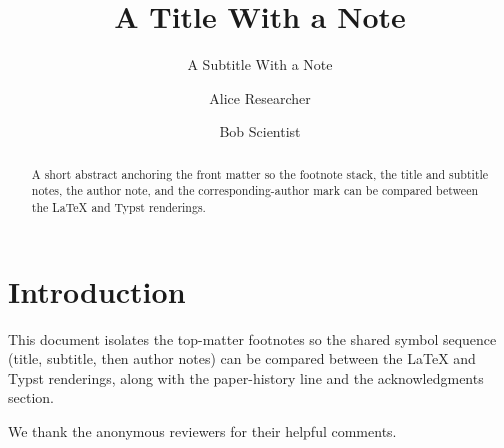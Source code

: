 \documentclass[acmsmall]{acmart}
\begin{document}
\title{A Title With a Note}
\subtitle{A Subtitle With a Note}

\author{Alice Researcher}

\author{Bob Scientist}
\correspondingauthor
{}

\renewcommand{\shortauthors}{Researcher and Scientist}

\begin{abstract}
  A short abstract anchoring the front matter so the footnote stack, the title
  and subtitle notes, the author note, and the corresponding-author mark can be
  compared between the LaTeX and Typst renderings.
\end{abstract}


\maketitle

\section{Introduction}
This document isolates the top-matter footnotes so the shared symbol sequence
(title, subtitle, then author notes) can be compared between the LaTeX and Typst
renderings, along with the paper-history line and the acknowledgments section.

\begin{acks}
We thank the anonymous reviewers for their helpful comments.
\end{acks}
\end{document}
